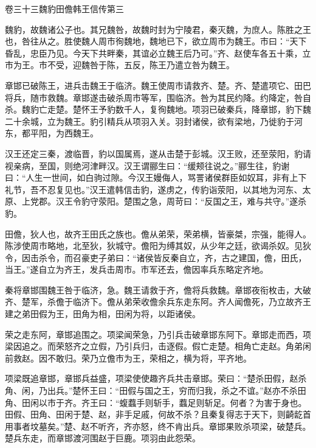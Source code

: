 \documentclass[12pt,UTF8]{ctexbook}
\begin{document}
卷三十三魏豹田儋韩王信传第三



魏豹，故魏诸公子也。其兄魏咎，故魏时封为宁陵君，秦灭魏，为庶人。陈胜之王也，咎往从之。胜使魏人周市徇魏地，魏地已下，欲立周市为魏王。市曰：“天下昏乱，忠臣乃见。今天下共畔秦，其谊必立魏王后乃可。”齐、赵使车各五十乘，立市为王。市不受，迎魏咎于陈，五反，陈王乃遣立咎为魏王。



章邯已破陈王，进兵击魏王于临济。魏王使周市请救齐、楚。齐、楚遣项它、田巴将兵，随市救魏。章邯遂击破杀周市等军，围临济。咎为其民约降。约降定，咎自杀。魏豹亡走楚。楚怀王予豹数千人，复徇魏地。项羽已破秦兵，降章邯，豹下魏二十余城，立为魏王。豹引精兵从项羽入关。羽封诸侯，欲有梁地，乃徙豹于河东，都平阳，为西魏王。



汉王还定三秦，渡临晋，豹以国属焉，遂从击楚于彭城。汉王败，还至荥阳，豹请视亲病，至国，则绝河津畔汉。汉王谓郦生曰：“缓颊往说之。”郦生往，豹谢曰：“人生一世间，如白驹过隙。今汉王嫚侮人，骂詈诸侯群臣如奴耳，非有上下礼节，吾不忍复见也。”汉王遣韩信击豹，遂虏之，传豹诣荥阳，以其地为河东、太原、上党郡。汉王令豹守荥阳。楚围之急，周苛曰：“反国之王，难与共守。”遂杀豹。



田儋，狄人也，故齐王田氏之族也。儋从弟荣，荣弟横，皆豪桀，宗强，能得人。陈涉使周市略地，北至狄，狄城守。儋阳为缚其奴，从少年之廷，欲谒杀奴。见狄令，因击杀令，而召豪吏子弟曰：“诸侯皆反秦自立，齐，古之建国，儋，田氏，当王。”遂自立为齐王，发兵击周市。市军还去，儋因率兵东略定齐地。



秦将章邯围魏王咎于临济，急。魏王请救于齐，儋将兵救魏。章邯夜衔枚击，大破齐、楚军，杀儋于临济下。儋从弟荣收儋余兵东走东阿。齐人闻儋死，乃立故齐王建之弟田假为王，田角为相，田闲为将，以距诸侯。



荣之走东阿，章邯追围之。项梁闻荣急，乃引兵击破章邯东阿下。章邯走而西，项梁因追之。而荣怒齐之立假，乃引兵归，击逐假。假亡走楚。相角亡走赵。角弟闲前救赵。因不敢归。荣乃立儋市为王，荣相之，横为将，平齐地。



项梁既追章邯，章邯兵益盛，项梁使使趣齐兵共击章邯。荣曰：“楚杀田假，赵杀角、闲，乃出兵。”楚怀王曰：“田假与国之王，穷而归我，杀之不谊。”赵亦不杀田角、田闲以市于齐。齐王曰：“蝮蠚手则斩手，蠚足则斩足。何者？为害于身也。田假、田角、田闲于楚、赵，非手足戚，何故不杀？且秦复得志于天下，则齮龁首用事者坟墓矣。”楚、赵不听齐，齐亦怒，终不肯出兵。章邯果败杀项梁，破楚兵。楚兵东走，而章邯渡河围赵于巨鹿。项羽由此怨荣。
\end{document}
